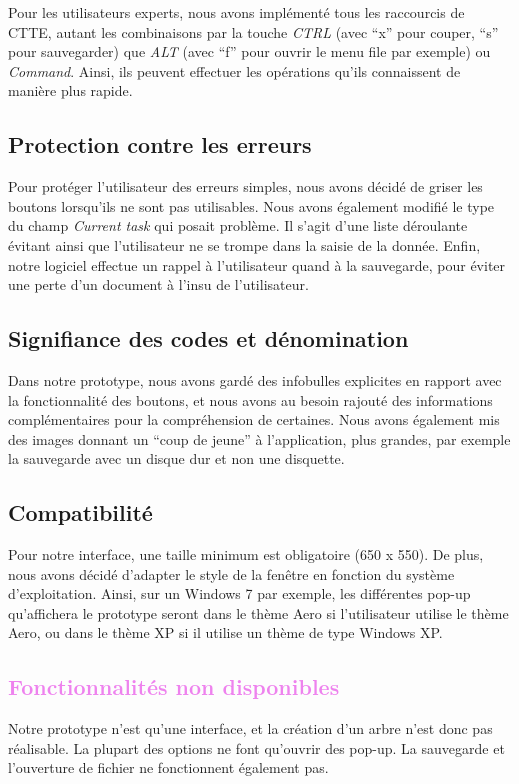 \documentclass[12pt, a4paper]{article}
\begin{document}
Pour les utilisateurs experts, nous avons implémenté tous les raccourcis de CTTE, autant les combinaisons par la touche \emph{CTRL} (avec ``x'' pour couper, ``s'' pour sauvegarder) que \emph{ALT} (avec ``f'' pour ouvrir le menu file par exemple) ou \emph{Command}. Ainsi, ils peuvent effectuer les opérations qu'ils connaissent de manière plus rapide. 
\textcolor{NavyBlue}{\subsection{Protection contre les erreurs}}

Pour protéger l'utilisateur des erreurs simples, nous avons décidé de griser les boutons lorsqu'ils ne sont pas utilisables. Nous avons également modifié le type du champ \emph{Current task} qui posait problème. Il s'agit d'une liste déroulante évitant ainsi que l'utilisateur ne se trompe dans la saisie de la donnée. Enfin, notre logiciel effectue un rappel à l'utilisateur quand à la sauvegarde, pour éviter une perte d'un document à l'insu de l'utilisateur.

\textcolor{NavyBlue}{\subsection{Signifiance des codes et dénomination}}

Dans notre prototype, nous avons gardé des infobulles explicites en rapport avec la fonctionnalité des boutons, et nous avons au besoin rajouté des informations complémentaires pour la compréhension de certaines. Nous avons également mis des images donnant un ``coup de jeune'' à l'application, plus grandes, par exemple la sauvegarde avec un disque dur et non une disquette.

\textcolor{NavyBlue}{\subsection{Compatibilité}}

Pour notre interface, une taille minimum est obligatoire (650 x 550). De plus, nous avons décidé d'adapter le style de la fenêtre en fonction du système d'exploitation. Ainsi, sur un Windows 7 par exemple, les différentes pop-up qu'affichera le prototype seront dans le thème Aero si l'utilisateur utilise le thème Aero, ou dans le thème XP si il utilise un thème de type Windows XP.

\textcolor{Violet}{\section{Fonctionnalités non disponibles}}

Notre prototype n'est qu'une interface, et la création d'un arbre n'est donc pas réalisable. La plupart des options ne font qu'ouvrir des pop-up. La sauvegarde et l'ouverture de fichier ne fonctionnent également pas.
\end{document}
